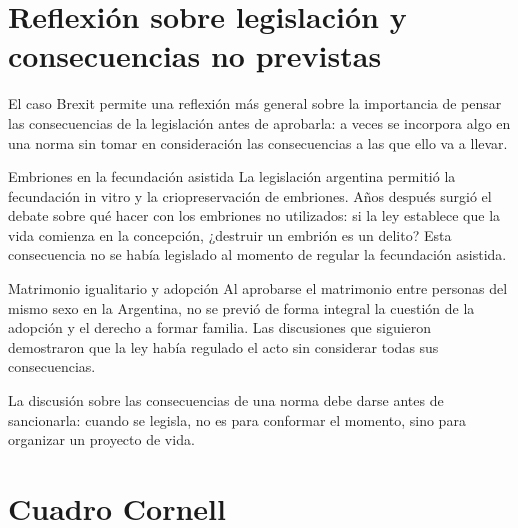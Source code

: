 \documentclass[12pt,oneside]{book}
\begin{document}
\section{Reflexión sobre legislación y consecuencias no previstas}

El caso Brexit permite una reflexión más general sobre la importancia de pensar las consecuencias de la legislación antes de aprobarla: a veces se incorpora algo en una norma sin tomar en consideración las consecuencias a las que ello va a llevar.

\begin{ejemplo}{Embriones en la fecundación asistida}
La legislación argentina permitió la fecundación in vitro y la criopreservación de embriones. Años después surgió el debate sobre qué hacer con los embriones no utilizados: si la ley establece que la vida comienza en la concepción, ¿destruir un embrión es un delito? Esta consecuencia no se había legislado al momento de regular la fecundación asistida.
\end{ejemplo}

\begin{ejemplo}{Matrimonio igualitario y adopción}
Al aprobarse el matrimonio entre personas del mismo sexo en la Argentina, no se previó de forma integral la cuestión de la adopción y el derecho a formar familia. Las discusiones que siguieron demostraron que la ley había regulado el acto sin considerar todas sus consecuencias.
\end{ejemplo}

\begin{importante}
La discusión sobre las consecuencias de una norma debe darse antes de sancionarla: cuando se legisla, no es para conformar el momento, sino para organizar un proyecto de vida.
\end{importante}

\section{Cuadro Cornell}
\end{document}
